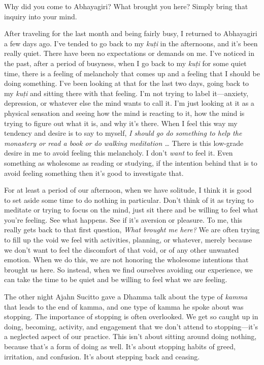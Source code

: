 
Why did you come to Abhayagiri? What brought you here? Simply bring 
that inquiry into your mind.

After traveling for the last month and being fairly busy, I returned to 
Abhayagiri a few days ago. I've tended to go back to my \emph{kuṭi} 
in the afternoons, and it's been really quiet. There have been no 
expectations or demands on me. I've noticed in the past, after a period 
of busyness, when I go back to my \emph{kuṭi} for some quiet time, 
there is a feeling of melancholy that comes up and a feeling that I 
should be doing something. I've been looking at that for the last two 
days, going back to my \emph{kuṭi} and sitting there with that 
feeling. I'm not trying to label it---anxiety, depression, or whatever 
else the mind wants to call it. I'm just looking at it as a physical 
sensation and seeing how the mind is reacting to it, how the mind is 
trying to figure out what it is, and why it's there. When I feel this 
way my tendency and desire is to say to myself, \emph{I should go do 
something to help the monastery or read a book or do walking meditation 
\ldots{}} There is this low-grade desire in me to avoid feeling this 
melancholy. I don't \emph{want} to feel it. Even something as wholesome 
as reading or studying, if the intention behind that is to avoid 
feeling something then it's good to investigate that.

For at least a period of our afternoon, when we have solitude, I think 
it is good to set aside some time to do nothing in particular. Don't 
think of it as trying to meditate or trying to focus on the mind, just 
sit there and be willing to feel what you're feeling. See what happens. 
See if it's aversion or pleasure. To me, this really gets back to that 
first question, \emph{What brought me here?} We are often trying to 
fill up the void we feel with activities, planning, or whatever, merely 
because we don't want to feel the discomfort of that void, or of any 
other unwanted emotion. When we do this, we are not honoring the 
wholesome intentions that brought us here. So instead, when we find 
ourselves avoiding our experience, we can take the time to be quiet and 
be willing to feel what we are feeling.


The other night Ajahn Sucitto gave a Dhamma talk about the type of 
\emph{kamma} that leads to the end of kamma, and one type of kamma he 
spoke about was stopping. The importance of stopping is often 
overlooked. We get so caught up in doing, becoming, activity, and 
engagement that we don't attend to stopping---it's a neglected aspect 
of our practice. This isn't about sitting around doing nothing, because 
that's a form of doing as well. It's about stopping habits of greed, 
irritation, and confusion. It's about stepping back and ceasing.

